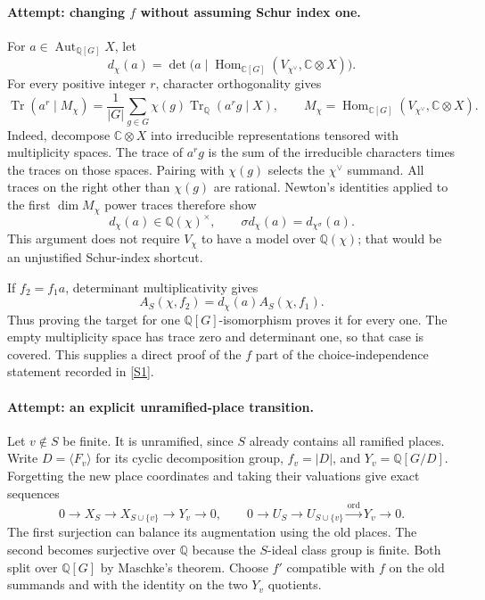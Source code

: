 \documentclass[11pt,a4paper]{article}
\newcommand{\Q}{\mathbb{Q}}
\newcommand{\C}{\mathbb{C}}
\newcommand{\sref}[2]{\hyperlink{source:#1:#2}{[S#2]}}
\numberwithin{equation}{section}
\begin{document}
\paragraph{Attempt: changing $f$ without assuming Schur index one.}
For $a\in\operatorname{Aut}_{\Q[G]}X$, let
\begin{equation}
 d_\chi(a)=\det\bigl(a\mid
 \operatorname{Hom}_{\C[G]}(V_{\chi^\vee},\C\otimes X)\bigr).
\end{equation}
For every positive integer $r$, character orthogonality gives
\begin{equation}\label{30006764:trace}
 \operatorname{Tr}(a^r\mid M_\chi)
 =\frac1{|G|}\sum_{g\in G}\chi(g)
   \operatorname{Tr}_{\Q}(a^r g\mid X),\qquad
 M_\chi=\operatorname{Hom}_{\C[G]}(V_{\chi^\vee},\C\otimes X).
\end{equation}
Indeed, decompose $\C\otimes X$ into irreducible representations tensored
with multiplicity spaces. The trace of $a^rg$ is the sum of the
irreducible characters times the traces on those spaces. Pairing with
$\chi(g)$ selects the $\chi^\vee$ summand. All traces on the right other
than $\chi(g)$ are rational. Newton's identities applied to the first
$\dim M_\chi$ power traces therefore show
\begin{equation}
 d_\chi(a)\in\Q(\chi)^\times,\qquad
 \sigma d_\chi(a)=d_{\chi^\sigma}(a).
\end{equation}
This argument does not require $V_\chi$ to have a model over $\Q(\chi)$;
that would be an unjustified Schur-index shortcut.

If $f_2=f_1a$, determinant multiplicativity gives
\begin{equation}
 A_S(\chi,f_2)=d_\chi(a)A_S(\chi,f_1).
\end{equation}
Thus proving the target for one $\Q[G]$-isomorphism proves it for every
one. The empty multiplicity space has trace zero and determinant one,
so that case is covered. This supplies a direct proof of the $f$ part
of the choice-independence statement recorded in \sref{30006764}{1}.

\paragraph{Attempt: an explicit unramified-place transition.}
Let $v\notin S$ be finite. It is unramified, since $S$ already contains
all ramified places. Write $D=\langle F_v\rangle$ for its cyclic
decomposition group, $f_v=|D|$, and $Y_v=\Q[G/D]$. Forgetting the new
place coordinates and taking their valuations give exact sequences
\begin{equation}
 0\to X_S\to X_{S\cup\{v\}}\to Y_v\to0,
 \qquad
 0\to U_S\to U_{S\cup\{v\}}\xrightarrow{\operatorname{ord}}Y_v\to0.
\end{equation}
The first surjection can balance its augmentation using the old places.
The second becomes surjective over $\Q$ because the $S$-ideal class
group is finite. Both split over $\Q[G]$ by Maschke's theorem. Choose
$f'$ compatible with $f$ on the old summands and with the identity on
the two $Y_v$ quotients.
\end{document}
